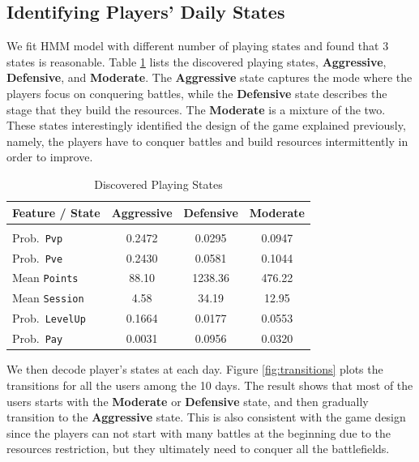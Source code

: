 \subsection{Identifying Players' Daily States}
We fit HMM model with different number of playing states and found that 3 states is reasonable. 
Table \ref{tab:states} lists the discovered playing states, \textbf{Aggressive}, 
\textbf{Defensive}, and \textbf{Moderate}.  The \textbf{Aggressive} state captures 
the mode where the players focus on conquering battles, while the \textbf{Defensive} 
state describes the stage that they build the resources. The \textbf{Moderate} is a mixture
of the two. These states interestingly identified the design of the game explained previously,
namely, the players have to conquer battles and build resources intermittently in order to improve. 
\begin{table}
\caption{Discovered Playing States}
\label{tab:states}
\centering
\begin{tabular}{lccc} 
\bf Feature / State & \textbf{Aggressive}  & \textbf{Defensive}  &  \textbf{Moderate} 
\\ \hline \\
 Prob.\ \texttt{Pvp}     &  0.2472  & 0.0295 &  0.0947  \\
 Prob.\ \texttt{Pve}     &  0.2430  & 0.0581 &  0.1044 \\
 Mean \texttt{Points} &  88.10   & 1238.36 &  476.22 \\
 Mean \texttt{Session}&  4.58    &  34.19  & 12.95 \\
 Prob.\ \texttt{LevelUp} &  0.1664  & 0.0177  & 0.0553 \\
 Prob.\ \texttt{Pay}     &  0.0031  & 0.0956  & 0.0320 \\
\end{tabular}
\end{table}

We then decode player's  states at each day.
Figure \ref{fig:transitions} plots the transitions for all the users among the 10 days. 
The result shows that most of the users starts with the \textbf{Moderate} or \textbf{Defensive} state, 
and then gradually transition to the \textbf{Aggressive} state. 
This is also consistent with the game design since the players can not start with many battles at
the beginning due to the resources restriction, but they ultimately need to 
conquer all the battlefields.


